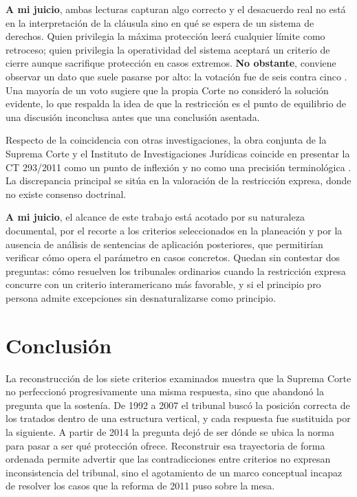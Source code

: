 \documentclass[
  spanish,
  letterpaper, oneside
]{article}
\begin{document}
\textbf{A mi juicio}, ambas lecturas capturan algo correcto y el desacuerdo real no está en la interpretación de la cláusula sino en qué se espera de un sistema de derechos. Quien privilegia la máxima protección leerá cualquier límite como retroceso; quien privilegia la operatividad del sistema aceptará un criterio de cierre aunque sacrifique protección en casos extremos. \textbf{No obstante}, conviene observar un dato que suele pasarse por alto: la votación fue de seis contra cinco \citep{scjnTesis2006225}. Una mayoría de un voto sugiere que la propia Corte no consideró la solución evidente, lo que respalda la idea de que la restricción es el punto de equilibrio de una discusión inconclusa antes que una conclusión asentada.

Respecto de la coincidencia con otras investigaciones, la obra conjunta de la Suprema Corte y el Instituto de Investigaciones Jurídicas coincide en presentar la CT 293/2011 como un punto de inflexión y no como una precisión terminológica \citep{scjnIijCT293y2017}. La discrepancia principal se sitúa en la valoración de la restricción expresa, donde no existe consenso doctrinal.

\textbf{A mi juicio}, el alcance de este trabajo está acotado por su naturaleza documental, por el recorte a los criterios seleccionados en la planeación y por la ausencia de análisis de sentencias de aplicación posteriores, que permitirían verificar cómo opera el parámetro en casos concretos. Quedan sin contestar dos preguntas: cómo resuelven los tribunales ordinarios cuando la restricción expresa concurre con un criterio interamericano más favorable, y si el principio pro persona admite excepciones sin desnaturalizarse como principio.

\clearpage
\section{Conclusión}

La reconstrucción de los siete criterios examinados muestra que la Suprema Corte no perfeccionó progresivamente una misma respuesta, sino que abandonó la pregunta que la sostenía. De 1992 a 2007 el tribunal buscó la posición correcta de los tratados dentro de una estructura vertical, y cada respuesta fue sustituida por la siguiente. A partir de 2014 la pregunta dejó de ser dónde se ubica la norma para pasar a ser qué protección ofrece. Reconstruir esa trayectoria de forma ordenada permite advertir que las contradicciones entre criterios no expresan inconsistencia del tribunal, sino el agotamiento de un marco conceptual incapaz de resolver los casos que la reforma de 2011 puso sobre la mesa.
\end{document}
